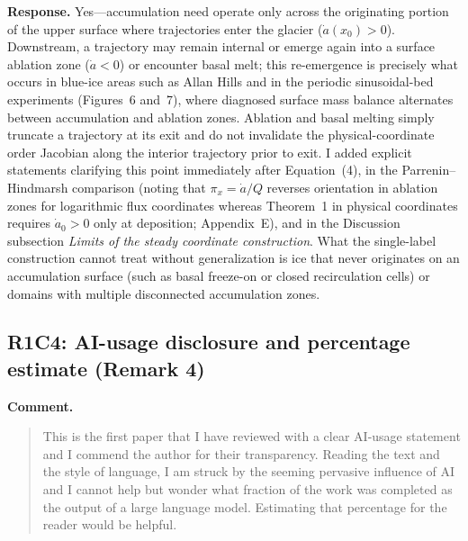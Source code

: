 \documentclass[11pt]{article}
\newcommand{\response}[1]{\noindent\textcolor{responseblue}{#1}}
\begin{document}
\response{\textbf{Response.} Yes---accumulation need operate only across the originating portion of the upper surface where trajectories enter the glacier (\(\dot a(x_0)>0\)). Downstream, a trajectory may remain internal or emerge again into a surface ablation zone (\(\dot a<0\)) or encounter basal melt; this re-emergence is precisely what occurs in blue-ice areas such as Allan Hills and in the periodic sinusoidal-bed experiments (Figures~6 and~7), where diagnosed surface mass balance alternates between accumulation and ablation zones. Ablation and basal melting simply truncate a trajectory at its exit and do not invalidate the physical-coordinate order Jacobian along the interior trajectory prior to exit. I added explicit statements clarifying this point immediately after Equation~(4), in the Parrenin--Hindmarsh comparison (noting that \(\pi_x=\dot a/Q\) reverses orientation in ablation zones for logarithmic flux coordinates whereas Theorem~1 in physical coordinates requires \(\dot a_0>0\) only at deposition; Appendix~E), and in the Discussion subsection \emph{Limits of the steady coordinate construction}. What the single-label construction cannot treat without generalization is ice that never originates on an accumulation surface (such as basal freeze-on or closed recirculation cells) or domains with multiple disconnected accumulation zones.}

\subsection*{R1C4: AI-usage disclosure and percentage estimate (Remark 4)}

\noindent\textbf{Comment.}
\begin{quote}
This is the first paper that I have reviewed with a clear AI-usage statement and I commend the author for their transparency. Reading the text and the style of language, I am struck by the seeming pervasive influence of AI and I cannot help but wonder what fraction of the work was completed as the output of a large language model. Estimating that percentage for the reader would be helpful.
\end{quote}
\end{document}
